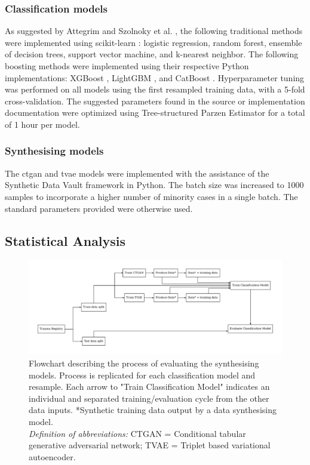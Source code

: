 \documentclass[12pt, letterpaper]{article}
\begin{document}
\subsubsection*{Classification models}
As suggested by Attegrim and Szolnoky et al. \cite{attergrim_predicting_2023}, the following traditional methods were implemented using scikit-learn \cite{pedregosa_scikit_2011}: logistic regression, random forest, ensemble of decision trees, support vector machine, and k-nearest neighbor. The following boosting methods were implemented using their respective Python implementations: XGBoost \cite{chen_xgboost_2016}, LightGBM \cite{ke_lightgbm_2017}, and CatBoost \cite{prokhorenkova_catboost_2018}. Hyperparameter tuning was performed on all models using the first resampled training data, with a 5-fold cross-validation. The suggested parameters found in the source or implementation documentation were optimized using Tree-structured Parzen Estimator \cite{bergstra_algorithms_2011} for a total of 1 hour per model.

\subsubsection*{Synthesising models}
The \acrfull{ctgan} \cite{xu_modeling_2019} and \acrfull{tvae} \cite{ishfaq_tvae_2018} models were implemented with the assistance of the Synthetic Data Vault framework \cite{patki_sdv_2016} in Python. The batch size was increased to 1000 samples to incorporate a higher number of minority cases in a single batch. The standard parameters provided were otherwise used.

\subsection{Statistical Analysis}
\begin{figure}[h]
    \centering
    \includegraphics[width=\textwidth]{figures/model_flowchart.pdf}
    \caption{Flowchart describing the process of evaluating the synthesising models. Process is replicated for each classification model and resample. Each arrow to "Train Classification Model" indicates an individual and separated training/evaluation cycle from the other data inputs. *Synthetic training data output by a data synthesising model.\\ \textit{Definition of abbreviations:} CTGAN = Conditional tabular generative adversarial network; TVAE = Triplet based variational autoencoder.}
    \label{fig:modelflowchart}
\end{figure}
\end{document}
